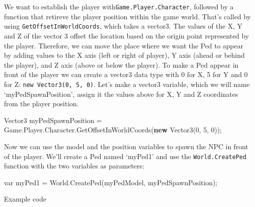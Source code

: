 \documentclass[
  openany]{book}
\newenvironment{Shaded}{\begin{snugshade}}{\end{snugshade}}
\newcommand{\DataTypeTok}[1]{\textcolor[rgb]{0.13,0.29,0.53}{#1}}
\newcommand{\DecValTok}[1]{\textcolor[rgb]{0.00,0.00,0.81}{#1}}
\newcommand{\FunctionTok}[1]{\textcolor[rgb]{0.00,0.00,0.00}{#1}}
\newcommand{\KeywordTok}[1]{\textcolor[rgb]{0.13,0.29,0.53}{\textbf{#1}}}
\newcommand{\NormalTok}[1]{#1}
\begin{document}
We want to establish the player with\texttt{Game.Player.Character}, followed by a function that retireve the player position within the game world. That's called by using \texttt{GetOffsetInWorldCoords}, which takes a vector3. The values of the X, Y and Z of the vector 3 offset the location based on the origin point represented by the player. Therefore, we can move the place where we want the Ped to appear by adding values to the X axis (left or right of player), Y axis (ahead or behind the player), and Z axis (above or below the player).
To make a Ped appear in front of the player we can create a vector3 data type with 0 for X, 5 for Y and 0 for Z: \texttt{new\ Vector3(0,\ 5,\ 0)}. Let's make a vector3 variable, which we will name `myPedSpawnPosition', assign it the values above for X, Y and Z coordinates from the player position.

\begin{Shaded}
\begin{Highlighting}[]
\NormalTok{Vector3 myPedSpawnPosition = Game.}\FunctionTok{Player}\NormalTok{.}\FunctionTok{Character}\NormalTok{.}\FunctionTok{GetOffsetInWorldCoords}\NormalTok{(}\KeywordTok{new} \FunctionTok{Vector3}\NormalTok{(}\DecValTok{0}\NormalTok{, }\DecValTok{5}\NormalTok{, }\DecValTok{0}\NormalTok{));}
\end{Highlighting}
\end{Shaded}

Now we can use the model and the position variables to spawn the NPC in front of the player. We'll create a Ped named `myPed1' and use the \texttt{World.CreatePed} function with the two variables as parameters:

\begin{Shaded}
\begin{Highlighting}[]
\DataTypeTok{var}\NormalTok{ myPed1 = World.}\FunctionTok{CreatePed}\NormalTok{(myPedModel, myPedSpawnPosition); }
\end{Highlighting}
\end{Shaded}

Example code
\end{document}
